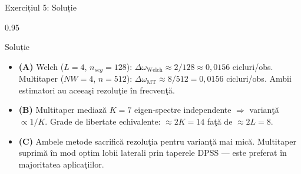 \documentclass[9pt, aspectratio=169, t]{beamer}
\begin{document}
\begin{frame}{Exercițiul 5: Soluție}
    \begin{cminipage}{0.95\textwidth}
    \begin{exampleblock}{Soluție}
        {\footnotesize
        \begin{itemize}\setlength{\itemsep}{0pt}
            \item \textcolor{MainBlue}{\textbf{(A)}} Welch ($L=4$, $n_{seg}=128$): $\Delta\omega_{\text{Welch}} \approx 2/128 \approx 0{,}0156$ cicluri/obs.
            Multitaper ($NW=4$, $n=512$): $\Delta\omega_{\text{MT}} \approx 8/512 = 0{,}0156$ cicluri/obs.
            Ambii estimatori au aceeaşi rezoluţie în frecvenţă.
            \item \textcolor{MainBlue}{\textbf{(B)}} Multitaper mediază $K=7$ eigen-spectre independente $\Rightarrow$ varianţă $\propto 1/K$. Grade de libertate echivalente: $\approx 2K=14$ faţă de $\approx 2L=8$.
            \item \textcolor{MainBlue}{\textbf{(C)}} Ambele metode sacrifică rezoluţia pentru varianţă mai mică. Multitaper suprimă în mod optim lobii laterali prin taperele DPSS --- este preferat în majoritatea aplicaţiilor.
        \end{itemize}
        }
    \end{exampleblock}
    \end{cminipage}
\end{frame}
\end{document}
